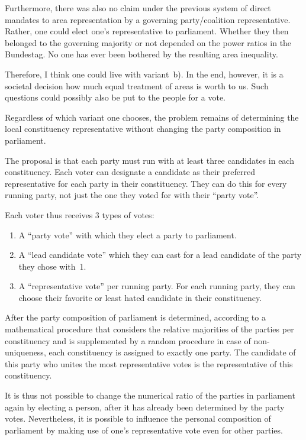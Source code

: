 Furthermore, there was also no claim under the previous system of direct mandates
to area representation by a governing party/coalition representative. Rather, one could
elect one's representative to parliament. Whether they then belonged to the governing majority or not
depended on the power ratios in the Bundestag. No one has ever been bothered by the resulting
area inequality.

Therefore, I think one could live with variant~b).
In the end, however, it is a societal decision how much equal treatment
of areas is worth to us. Such questions could possibly also be put to the people for a vote.

Regardless of which variant one chooses, the problem remains of determining the local
constituency representative without changing the party composition in parliament.

The
proposal is that each party must run with at least three candidates in each constituency.
Each voter can designate a candidate as their preferred representative for each party in their constituency.
They can do this for every running party, not just the one they
voted for with their \enquote{party vote}.

Each voter thus receives 3 types of
votes:
\begin{enumerate}
  \item A \enquote{party vote} with which they elect a party to parliament.
  \item A \enquote{lead candidate vote} which they can cast for a lead candidate of the party they chose with~1.
  \item A \enquote{representative vote} per running party. For each running party, they can
    choose their favorite or least hated candidate in their constituency.
\end{enumerate}
After the party composition of parliament is determined, according to a mathematical
procedure that considers the relative majorities of the parties per constituency and is
supplemented by a random procedure in case of non-uniqueness, each constituency is assigned to exactly one party.
The candidate of this party who unites the most representative votes is
the representative of this constituency.

It is thus not possible to change the
numerical ratio of the parties in parliament again by electing a person, after it has already been determined by the
party votes. Nevertheless, it is possible to influence the personal composition
of parliament by making use of one's representative vote even for other parties.

